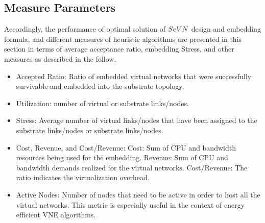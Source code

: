 \subsection{Measure Parameters}
 Accordingly, the performance of optimal solution of $SeVN$ design and embedding formula, and different measures of heuristic algorithms are presented in this section in terms of average acceptance ratio, embedding Stress, and other measures as described in the follow.
\begin{itemize}
  \item Accepted Ratio: Ratio of embedded virtual networks that were successfully survivable and embedded into the substrate topology.
  \item Utilization:  number of virtual or substrate links/nodes.
  \item Stress: Average number of virtual links/nodes that have been assigned to the substrate links/nodes or  substrate links/nodes.
  \item Cost, Revenue, and Cost/Revenue: Cost: Sum of CPU and bandwidth resources being used for the embedding. Revenue: Sum of CPU and bandwidth demands realized for the virtual networks. Cost/Revenue: The ratio indicates the virtualization overhead.
 \item Active Nodes: Number of nodes that need to be active in order to host all the virtual networks. This metric is especially useful in the context of energy efficient VNE algorithms.
\end{itemize}

